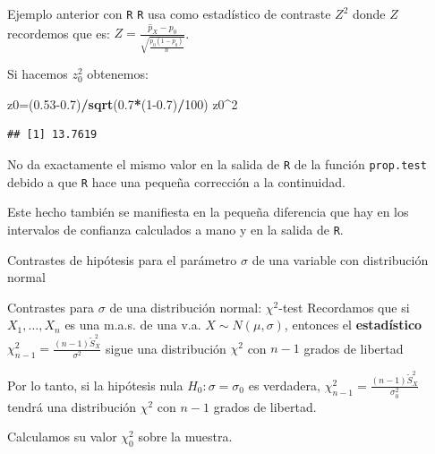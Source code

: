 \documentclass[
  ignorenonframetext,
]{beamer}
\newenvironment{Shaded}{\begin{snugshade}}{\end{snugshade}}
\newcommand{\DecValTok}[1]{\textcolor[rgb]{0.00,0.00,0.81}{#1}}
\newcommand{\FloatTok}[1]{\textcolor[rgb]{0.00,0.00,0.81}{#1}}
\newcommand{\KeywordTok}[1]{\textcolor[rgb]{0.13,0.29,0.53}{\textbf{#1}}}
\newcommand{\NormalTok}[1]{#1}
\newcommand{\OperatorTok}[1]{\textcolor[rgb]{0.81,0.36,0.00}{\textbf{#1}}}
\begin{document}
\begin{frame}[fragile]{Ejemplo anterior con \texttt{R}}
\protect\hypertarget{ejemplo-anterior-con-r-1}{}
\texttt{R} usa como estadístico de contraste \(Z^2\) donde \(Z\)
recordemos que es:
\(Z=\frac{\widehat{p}_X-p_0}{\sqrt{\frac{p_0(1-p_0)}{n}}}\).

Si hacemos \(z_0^2\) obtenemos:

\begin{Shaded}
\begin{Highlighting}[]
\NormalTok{z0=(}\FloatTok{0.53{-}0.7}\NormalTok{)}\OperatorTok{/}\KeywordTok{sqrt}\NormalTok{(}\FloatTok{0.7}\OperatorTok{*}\NormalTok{(}\DecValTok{1}\FloatTok{{-}0.7}\NormalTok{)}\OperatorTok{/}\DecValTok{100}\NormalTok{)}
\NormalTok{z0}\OperatorTok{\^{}}\DecValTok{2}
\end{Highlighting}
\end{Shaded}

\begin{verbatim}
## [1] 13.7619
\end{verbatim}

No da exactamente el mismo valor en la salida de \texttt{R} de la
función \texttt{prop.test} debido a que \texttt{R} hace una pequeña
corrección a la continuidad.

Este hecho también se manifiesta en la pequeña diferencia que hay en los
intervalos de confianza calculados a mano y en la salida de \texttt{R}.
\end{frame}

\begin{frame}{Contrastes de hipótesis para el parámetro \(\sigma\) de
una variable con distribución normal}
\protect\hypertarget{contrastes-de-hipuxf3tesis-para-el-paruxe1metro-sigma-de-una-variable-con-distribuciuxf3n-normal}{}
\end{frame}

\begin{frame}{Contrastes para \(\sigma\) de una distribución normal:
\(\chi^2\)-test}
\protect\hypertarget{contrastes-para-sigma-de-una-distribuciuxf3n-normal-chi2-test}{}
Recordamos que si \(X_1,\ldots,X_n\) es una m.a.s. de una v.a.
\(X\sim N(\mu,\sigma)\), entonces el \textbf{estadístico}
\(\chi_{n-1}^2=\frac{(n-1)\widetilde{S}_X^2}{\sigma^2}\) sigue una
distribución \(\chi^2\) con \(n-1\) grados de libertad

Por lo tanto, si la hipótesis nula \(H_0:\sigma=\sigma_0\) es verdadera,
\(\chi_{n-1}^2=\frac{(n-1) \widetilde{S}_X^2}{\sigma_0^2}\) tendrá una
distribución \(\chi^2\) con \(n-1\) grados de libertad.

Calculamos su valor \(\chi^2_0\) sobre la muestra.
\end{frame}
\end{document}
